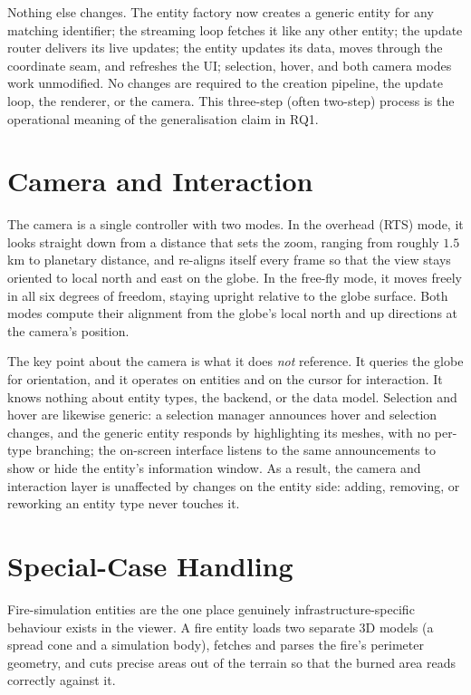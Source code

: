 Nothing else changes. The entity factory now creates a generic entity for any matching identifier; the streaming loop fetches it like any other entity; the update router delivers its live updates; the entity updates its data, moves through the coordinate seam, and refreshes the UI; selection, hover, and both camera modes work unmodified. No changes are required to the creation pipeline, the update loop, the renderer, or the camera. This three-step (often two-step) process is the operational meaning of the generalisation claim in RQ1.

\section{Camera and Interaction}
\label{sec:impl-camera}

The camera is a single controller with two modes. In the overhead (RTS) mode, it looks straight down from a distance that sets the zoom, ranging from roughly $1.5$\,km to planetary distance, and re-aligns itself every frame so that the view stays oriented to local north and east on the globe. In the free-fly mode, it moves freely in all six degrees of freedom, staying upright relative to the globe surface. Both modes compute their alignment from the globe's local north and up directions at the camera's position.

The key point about the camera is what it does \emph{not} reference. It queries the globe for orientation, and it operates on entities and on the cursor for interaction. It knows nothing about entity types, the backend, or the data model. Selection and hover are likewise generic: a selection manager announces hover and selection changes, and the generic entity responds by highlighting its meshes, with no per-type branching; the on-screen interface listens to the same announcements to show or hide the entity's information window. As a result, the camera and interaction layer is unaffected by changes on the entity side: adding, removing, or reworking an entity type never touches it.

\section{Special-Case Handling}
\label{sec:impl-special}

Fire-simulation entities are the one place genuinely infrastructure-specific behaviour exists in the viewer. A fire entity loads two separate 3D models (a spread cone and a simulation body), fetches and parses the fire's perimeter geometry, and cuts precise areas out of the terrain so that the burned area reads correctly against it.

